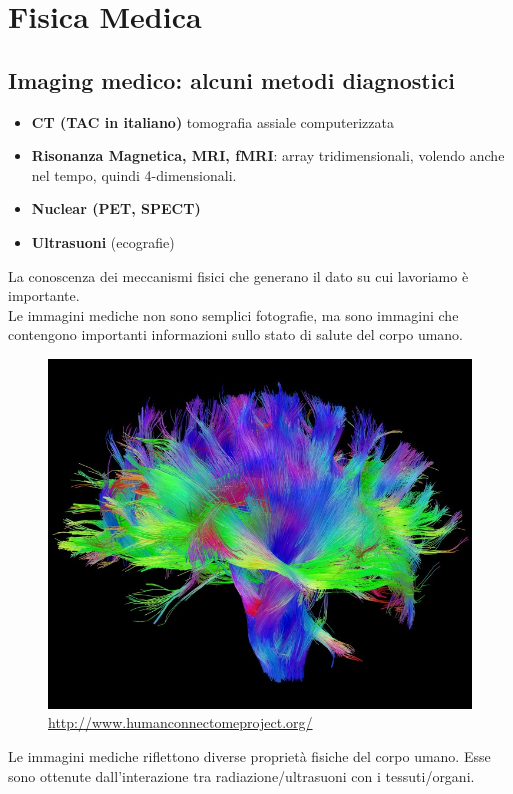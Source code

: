 \chapter{Fisica Medica}

\section{Imaging medico: alcuni metodi diagnostici}

\begin{itemize}
	\item \textbf{CT (TAC in italiano)} tomografia assiale computerizzata
	\item \textbf{Risonanza Magnetica, MRI, fMRI}: array tridimensionali, volendo anche nel tempo, quindi 4-dimensionali.
	\item \textbf{Nuclear (PET, SPECT)}
	\item \textbf{Ultrasuoni} (ecografie)
\end{itemize}

La conoscenza dei meccanismi fisici che generano il dato su cui lavoriamo è importante.\\
Le immagini mediche non sono semplici fotografie, ma sono immagini che contengono importanti informazioni sullo stato di salute del corpo umano.\\

\begin{figure}[ht]
	\centering
	\includegraphics[width=0.6\linewidth]{figure_med/White-Matter-Fibers.jpg}
	\caption{\url{http://www.humanconnectomeproject.org/}}
\end{figure}
\FloatBarrier

Le immagini mediche riflettono diverse proprietà fisiche del corpo umano. Esse sono ottenute dall'interazione tra radiazione/ultrasuoni con i tessuti/organi.\\

